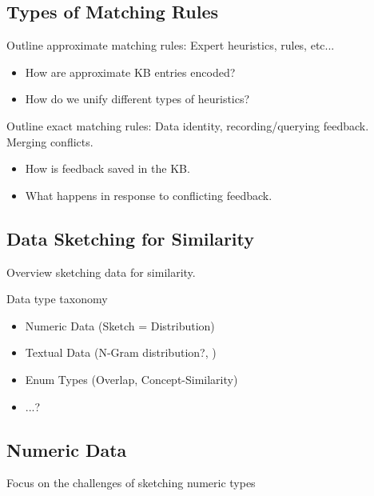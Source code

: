 


\subsection{Types of Matching Rules}



Outline approximate matching rules: Expert heuristics, rules, etc...
\begin{itemize}
  \item How are approximate KB entries encoded?
  \item How do we unify different types of heuristics?
\end{itemize}



Outline exact matching rules: Data identity, recording/querying feedback.  Merging conflicts.

\begin{itemize}
  \item How is feedback saved in the KB.
  \item What happens in response to conflicting feedback.  
\end{itemize}


\subsection{Data Sketching for Similarity}
Overview sketching data for similarity.  

Data type taxonomy
\begin{itemize}
  \item Numeric Data (Sketch = Distribution)
  \item Textual Data (N-Gram distribution?, )
  \item Enum Types (Overlap, Concept-Similarity)
  \item ...?
\end{itemize}

\subsection{Numeric Data}
Focus on the challenges of sketching numeric types

